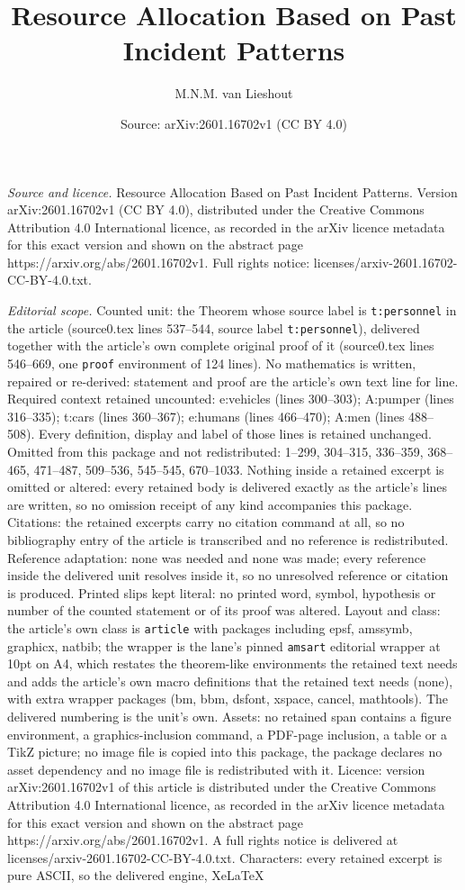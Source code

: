 \documentclass[10pt,a4paper]{amsart}
\title[Resource Allocation Based on Past Incident Patterns]{Resource Allocation Based on Past Incident Patterns}
\author{M.N.M. van Lieshout}
\date{Source: arXiv:2601.16702v1 (CC BY 4.0)}
\begin{document}
\maketitle

\noindent\emph{Source and licence.} Resource Allocation Based on Past Incident Patterns. Version arXiv:2601.16702v1 (CC BY 4.0), distributed under the Creative Commons Attribution 4.0 International licence, as recorded in the arXiv licence metadata for this exact version and shown on the abstract page https://arxiv.org/abs/2601.16702v1. Full rights notice: licenses/arxiv-2601.16702-CC-BY-4.0.txt.\par\smallskip

\noindent\textit{Editorial scope.} Counted unit: the Theorem whose source label is \texttt{t:personnel} in the article (source0.tex lines 537--544, source label \texttt{t:personnel}), delivered together with the article's own complete original proof of it (source0.tex lines 546--669, one \texttt{proof} environment of 124 lines). No mathematics is written, repaired or re-derived: statement and proof are the article's own text line for line. Required context retained uncounted: e:vehicles (lines 300--303); A:pumper (lines 316--335); t:cars (lines 360--367); e:humans (lines 466--470); A:men (lines 488--508). Every definition, display and label of those lines is retained unchanged. Omitted from this package and not redistributed: 1--299, 304--315, 336--359, 368--465, 471--487, 509--536, 545--545, 670--1033. Nothing inside a retained excerpt is omitted or altered: every retained body is delivered exactly as the article's lines are written, so no omission receipt of any kind accompanies this package. Citations: the retained excerpts carry no citation command at all, so no bibliography entry of the article is transcribed and no reference is redistributed. Reference adaptation: none was needed and none was made; every reference inside the delivered unit resolves inside it, so no unresolved reference or citation is produced. Printed slips kept literal: no printed word, symbol, hypothesis or number of the counted statement or of its proof was altered. Layout and class: the article's own class is \texttt{article} with packages including epsf, amssymb, graphicx, natbib; the wrapper is the lane's pinned \texttt{amsart} editorial wrapper at 10pt on A4, which restates the theorem-like environments the retained text needs and adds the article's own macro definitions that the retained text needs (none), with extra wrapper packages (bm, bbm, dsfont, xspace, cancel, mathtools). The delivered numbering is the unit's own. Assets: no retained span contains a figure environment, a graphics-inclusion command, a PDF-page inclusion, a table or a TikZ picture; no image file is copied into this package, the package declares no asset dependency and no image file is redistributed with it. Licence: version arXiv:2601.16702v1 of this article is distributed under the Creative Commons Attribution 4.0 International licence, as recorded in the arXiv licence metadata for this exact version and shown on the abstract page https://arxiv.org/abs/2601.16702v1. A full rights notice is delivered at licenses/arxiv-2601.16702-CC-BY-4.0.txt. Characters: every retained excerpt is pure ASCII, so the delivered engine, XeLaTeX 
\end{document}
